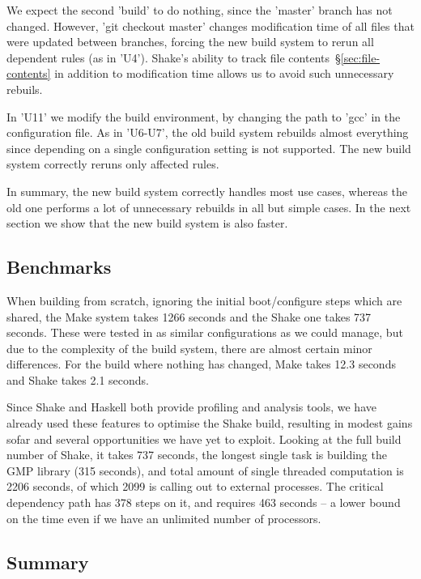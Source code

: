 We expect the second \lst'build' to do nothing, since the \lst'master'
branch has not changed. However, \lst'git checkout master' changes modification
time of all files that were updated between branches, forcing the new
build system to rerun all dependent rules (as in \lst'U4'). Shake's ability to
track file contents~\S\ref{sec:file-contents} in addition to modification time allows us to
avoid such unnecessary rebuils.

In \lst'U11' we modify the build environment, by changing the path to \lst'gcc'
in the configuration file. As in \lst'U6-U7', the old build system rebuilds
almost everything since depending on a single configuration setting is not
supported. The new build system correctly reruns only affected rules.

In summary, the new build system correctly handles most use cases, whereas
the old one performs a lot of unnecessary rebuilds in all but simple cases. In
the next section we show that the new build system is also faster.

\subsection{Benchmarks\label{sec:benchmarks}}

When building from scratch, ignoring the initial boot/configure steps which are shared, the Make system takes 1266 seconds and the Shake one takes 737 seconds. These were tested in as similar configurations as we could manage, but due to the complexity of the build system, there are almost certain minor differences. For the build where nothing has changed, Make takes 12.3 seconds and Shake takes 2.1 seconds. 

Since Shake and Haskell both provide profiling and analysis tools, we have already used these features to optimise the Shake build, resulting in modest gains sofar and several opportunities we have yet to exploit. Looking at the full build number of Shake, it takes 737 seconds, the longest single task is building the GMP library (315 seconds), and total amount of single threaded computation is 2206 seconds, of which 2099 is calling out to external processes. The critical dependency path has 378 steps on it, and requires 463 seconds -- a lower bound on the time even if we have an unlimited number of processors.

\subsection{Summary}





